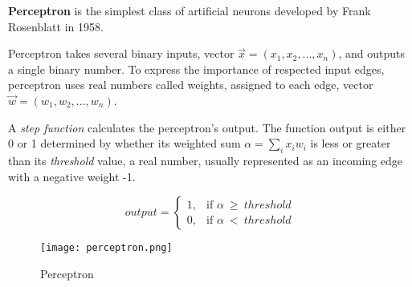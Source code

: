 \textbf{Perceptron} is the simplest class of artificial neurons developed by Frank Rosenblatt in 1958.\cite{perceptronprobabmodel}

Perceptron takes several binary inputs, vector $\vec{x} = (x_1, x_2,...,x_n)$, and outputs a single binary number. To express the importance of respected input edges, perceptron uses real numbers called weights, assigned to each edge, vector $\vec{w} = (w_1,w_2,...,w_n)$.

A \textit{step function} calculates the perceptron's output.
The function output is either 0 or 1 determined by whether its weighted sum $\alpha = \sum_{i} x_i w_i$ is less or greater than its \textit{threshold} value, a real number, usually represented as an incoming edge with a negative weight -1.\cite{matous}

\begin{equation}
    output =
\begin{cases}
    1, & \text{if $\alpha\ \geq\ threshold$}\\
    0, & \text{if $\alpha\ <\ threshold$}
\end{cases} 
\end{equation} 


\begin{figure}[h]
	\centering
    \texttt{[image: perceptron.png]}
	\caption{Perceptron \cite{matous}}
	\label{fig:perceptron}
\end{figure}
